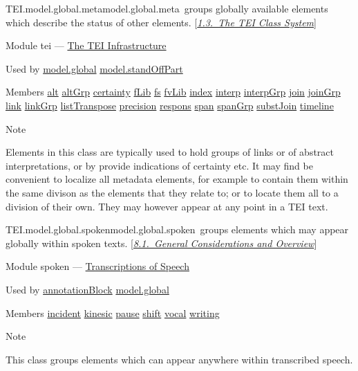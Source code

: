\begin{reflist}
\item[]\begin{specHead}{TEI.model.global.meta}{model.global.meta} groups globally available elements which describe the status of other elements. [\textit{\hyperref[STEC]{1.3.\ The TEI Class System}}]\end{specHead} 
    \item[{Module}]
  tei — \hyperref[ST]{The TEI Infrastructure}
    \item[{Used by}]
  \hyperref[TEI.model.global]{model.global} \hyperref[TEI.model.standOffPart]{model.standOffPart}
    \item[{Members}]
  \hyperref[TEI.alt]{alt} \hyperref[TEI.altGrp]{altGrp} \hyperref[TEI.certainty]{certainty} \hyperref[TEI.fLib]{fLib} \hyperref[TEI.fs]{fs} \hyperref[TEI.fvLib]{fvLib} \hyperref[TEI.index]{index} \hyperref[TEI.interp]{interp} \hyperref[TEI.interpGrp]{interpGrp} \hyperref[TEI.join]{join} \hyperref[TEI.joinGrp]{joinGrp} \hyperref[TEI.link]{link} \hyperref[TEI.linkGrp]{linkGrp} \hyperref[TEI.listTranspose]{listTranspose} \hyperref[TEI.precision]{precision} \hyperref[TEI.respons]{respons} \hyperref[TEI.span]{span} \hyperref[TEI.spanGrp]{spanGrp} \hyperref[TEI.substJoin]{substJoin} \hyperref[TEI.timeline]{timeline}
    \item[{Note}]
  \par
Elements in this class are typically used to hold groups of links or of abstract interpretations, or by provide indications of certainty etc. It may find be convenient to localize all metadata elements, for example to contain them within the same divison as the elements that they relate to; or to locate them all to a division of their own. They may however appear at any point in a TEI text.
\end{reflist}  
\begin{reflist}
\item[]\begin{specHead}{TEI.model.global.spoken}{model.global.spoken} groups elements which may appear globally within spoken texts. [\textit{\hyperref[TSOV]{8.1.\ General Considerations and Overview}}]\end{specHead} 
    \item[{Module}]
  spoken — \hyperref[TS]{Transcriptions of Speech}
    \item[{Used by}]
  \hyperref[TEI.annotationBlock]{annotationBlock} \hyperref[TEI.model.global]{model.global}
    \item[{Members}]
  \hyperref[TEI.incident]{incident} \hyperref[TEI.kinesic]{kinesic} \hyperref[TEI.pause]{pause} \hyperref[TEI.shift]{shift} \hyperref[TEI.vocal]{vocal} \hyperref[TEI.writing]{writing}
    \item[{Note}]
  \par
This class groups elements which can appear anywhere within transcribed speech. 
\end{reflist}  
